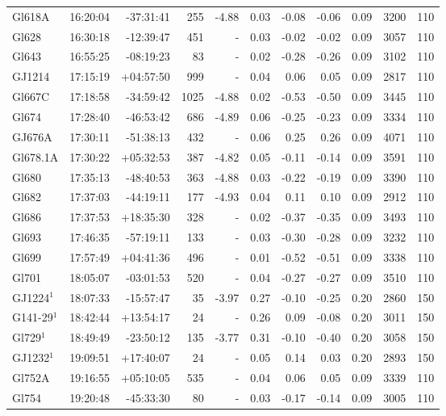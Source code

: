 \documentclass{aa}
\begin{document}
{\begin{longtable}{l r r r r r r r r r r}
Gl618A & 16:20:04 & -37:31:41 & 255 & -4.88 & 0.03 & -0.08 & -0.06 & 0.09 & 3200 &  110 \\
Gl628 & 16:30:18 & -12:39:47 & 451 &    - & 0.03 & -0.02 & -0.02 & 0.09 & 3057 &  110 \\
Gl643 & 16:55:25 & -08:19:23 & 83 &    - & 0.02 & -0.28 & -0.26 & 0.09 & 3102 &  110 \\
GJ1214 & 17:15:19 & +04:57:50 & 999 &    - & 0.04 & 0.06 & 0.05 & 0.09 & 2817 &  110 \\
Gl667C & 17:18:58 & -34:59:42 & 1025 & -4.88 & 0.02 & -0.53 & -0.50 & 0.09 & 3445 &  110 \\
Gl674 & 17:28:40 & -46:53:42 & 686 & -4.89 & 0.06 & -0.25 & -0.23 & 0.09 & 3334 &  110 \\
GJ676A & 17:30:11 & -51:38:13 & 432 &    - & 0.06 & 0.25 & 0.26 & 0.09 & 4071 &  110 \\
Gl678.1A & 17:30:22 & +05:32:53 & 387 & -4.82 & 0.05 & -0.11 & -0.14 & 0.09 & 3591 &  110 \\
Gl680 & 17:35:13 & -48:40:53 & 363 & -4.88 & 0.03 & -0.22 & -0.19 & 0.09 & 3390 &  110 \\
Gl682 & 17:37:03 & -44:19:11 & 177 & -4.93 & 0.04 & 0.11 & 0.10 & 0.09 & 2912 &  110 \\
Gl686 & 17:37:53 & +18:35:30 & 328 &    - & 0.02 & -0.37 & -0.35 & 0.09 & 3493 &  110 \\
Gl693 & 17:46:35 & -57:19:11 & 133 &    - & 0.03 & -0.30 & -0.28 & 0.09 & 3232 &  110 \\
Gl699 & 17:57:49 & +04:41:36 & 496 &    - & 0.01 & -0.52 & -0.51 & 0.09 & 3338 &  110 \\
Gl701 & 18:05:07 & -03:01:53 & 520 &    - & 0.04 & -0.27 & -0.27 & 0.09 & 3510 &  110 \\
GJ1224$^1$ & 18:07:33 & -15:57:47 & 35 & -3.97 & 0.27 & -0.10 & -0.25 & 0.20 & 2860 &  150 \\
G141-29$^1$ & 18:42:44 & +13:54:17 & 24 &    - & 0.26 & 0.09 & -0.08 & 0.20 & 3011 &  150 \\
Gl729$^1$ & 18:49:49 & -23:50:12 & 135 & -3.77 & 0.31 & -0.10 & -0.40 & 0.20 & 3058 &  150 \\
GJ1232$^1$ & 19:09:51 & +17:40:07 & 24 &    - & 0.05 & 0.14 & 0.03 & 0.20 & 2893 &  150 \\
Gl752A & 19:16:55 & +05:10:05 & 535 &    - & 0.04 & 0.06 & 0.05 & 0.09 & 3339 &  110 \\
Gl754 & 19:20:48 & -45:33:30 & 80 &    - & 0.03 & -0.17 & -0.14 & 0.09 & 3005 &  110 \\

\end{longtable}}
\end{document}
